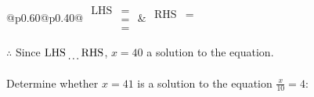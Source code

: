 \documentclass[12pt]{article}
\newcounter{minipagecount}
\begin{document}
\begin{multicols}{2}
\begin{minipage}[t]{0.40\textwidth}
    \noindent
    \renewcommand{\arraystretch}{1.3} %
    \begin{tabular}{@{}p{0.60\linewidth}@{}p{0.40\linewidth}@{}}
        \(\begin{aligned}
            \text{LHS} &=  \\
                    &=  \\
                    &= 
        \end{aligned}\) &
        \(\begin{aligned}
            \text{RHS} &= \\
                    & \\
                    &
        \end{aligned}\)
    \end{tabular}
    \renewcommand{\arraystretch}{1.0} %
    \vspace{2pt}  %

    \noindent \(\therefore\) Since \(\text{LHS} \dotuline{\hspace{5mm}} \text{RHS}\), \(x = 40\) \dotuline{\hspace{12mm}} a solution to the equation.

\end{minipage}

\vspace*{0.5ex}
\vfill{}
\noindent{(\theminipagecount)}\hspace{0.1mm} %
\begin{minipage}[t]{0.40\textwidth} %

    \noindent Determine whether \(x = 41\) is a solution to the equation \(\frac{x}{10} = 4\):
    \vspace{2pt}  %


\end{minipage}
\end{multicols}
\end{document}
